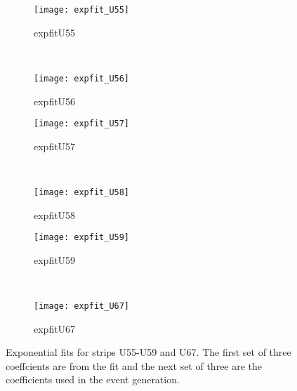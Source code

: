 \begin{figure}[h]
    \centering
    \begin{subfigure}[h]{0.44\textwidth}
        \centering
        \texttt{[image: expfit\_U55]}
        \caption{expfitU55}
        \label{fig:expfit_U55}
    \end{subfigure}
    ~
    \begin{subfigure}[h]{0.44\textwidth}
        \centering
        \texttt{[image: expfit\_U56]}
        \caption{expfitU56}
        \label{fig:expfit_U56}
    \end{subfigure}
    
    \begin{subfigure}[h]{0.44\textwidth}
        \centering
        \texttt{[image: expfit\_U57]}
        \caption{expfitU57}
        \label{fig:expfit_U57}
    \end{subfigure}
    ~
    \begin{subfigure}[h]{0.44\textwidth}
        \centering
        \texttt{[image: expfit\_U58]}
        \caption{expfitU58}
        \label{fig:expfit_U58}
    \end{subfigure}
    
    \begin{subfigure}[h]{0.44\textwidth}
        \centering
        \texttt{[image: expfit\_U59]}
        \caption{expfitU59}
        \label{fig:expfit_U59}
    \end{subfigure}
    ~
    \begin{subfigure}[h]{0.44\textwidth}
        \centering
        \texttt{[image: expfit\_U67]}
        \caption{expfitU67}
        \label{fig:expfit_U67}
    \end{subfigure}
    \caption{Exponential fits for strips U55-U59 and U67. The first set of three coeffcients are from the fit and the next set of three are
     the coefficients used in the event generation.}
    \label{fig:expfit2}
\end{figure}
\FloatBarrier

\FloatBarrier
